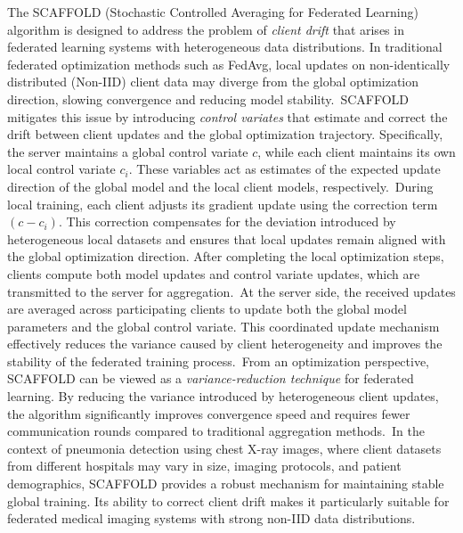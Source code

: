 \documentclass[12pt]{book}
\begin{document}
The SCAFFOLD (Stochastic Controlled Averaging for Federated Learning) algorithm is designed to address the problem of \textit{client drift} that arises in federated learning systems with heterogeneous data distributions. In traditional federated optimization methods such as FedAvg, local updates on non-identically distributed (Non-IID) client data may diverge from the global optimization direction, slowing convergence and reducing model stability.\
SCAFFOLD mitigates this issue by introducing \textit{control variates} that estimate and correct the drift between client updates and the global optimization trajectory. Specifically, the server maintains a global control variate $c$, while each client maintains its own local control variate $c_i$. These variables act as estimates of the expected update direction of the global model and the local client models, respectively.\
During local training, each client adjusts its gradient update using the correction term $(c - c_i)$. This correction compensates for the deviation introduced by heterogeneous local datasets and ensures that local updates remain aligned with the global optimization direction. After completing the local optimization steps, clients compute both model updates and control variate updates, which are transmitted to the server for aggregation.\
At the server side, the received updates are averaged across participating clients to update both the global model parameters and the global control variate. This coordinated update mechanism effectively reduces the variance caused by client heterogeneity and improves the stability of the federated training process.\
From an optimization perspective, SCAFFOLD can be viewed as a \textit{variance-reduction technique} for federated learning. By reducing the variance introduced by heterogeneous client updates, the algorithm significantly improves convergence speed and requires fewer communication rounds compared to traditional aggregation methods.\
In the context of pneumonia detection using chest X-ray images, where client datasets from different hospitals may vary in size, imaging protocols, and patient demographics, SCAFFOLD provides a robust mechanism for maintaining stable global training. Its ability to correct client drift makes it particularly suitable for federated medical imaging systems with strong non-IID data distributions.
\vspace{-5cm}
\end{document}
